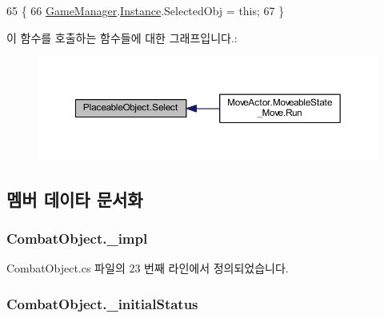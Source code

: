\begin{DoxyCode}
65     \{
66         \hyperlink{class_game_manager}{GameManager}.\hyperlink{class_m_c_n_1_1_singletone_a46dbbebd93e96a9592a9803c51f35602}{Instance}.SelectedObj = \textcolor{keyword}{this};
67     \}
\end{DoxyCode}


이 함수를 호출하는 함수들에 대한 그래프입니다.\+:
\nopagebreak
\begin{figure}[H]
\begin{center}
\leavevmode
\includegraphics[width=350pt]{class_placeable_object_a019818f3f6c6eb715fed163efa921f5a_icgraph}
\end{center}
\end{figure}




\subsection{멤버 데이타 문서화}
\subsubsection[{\texorpdfstring{\+\_\+impl}{_impl}}]{ Combat\+Object.\+\_\+impl\hspace{0.3cm}{\ttfamily [private]}}\hypertarget{class_combat_object_ab20a8e6719930a9e416b81bc8922bd1b}{}\label{class_combat_object_ab20a8e6719930a9e416b81bc8922bd1b}


Combat\+Object.\+cs 파일의 23 번째 라인에서 정의되었습니다.

\subsubsection[{\texorpdfstring{\+\_\+initial\+Status}{_initialStatus}}]{ Combat\+Object.\+\_\+initial\+Status}\hypertarget{class_combat_object_a8989ba48addd736a18b9e3074ffe5a5f}{}\label{class_combat_object_a8989ba48addd736a18b9e3074ffe5a5f}


